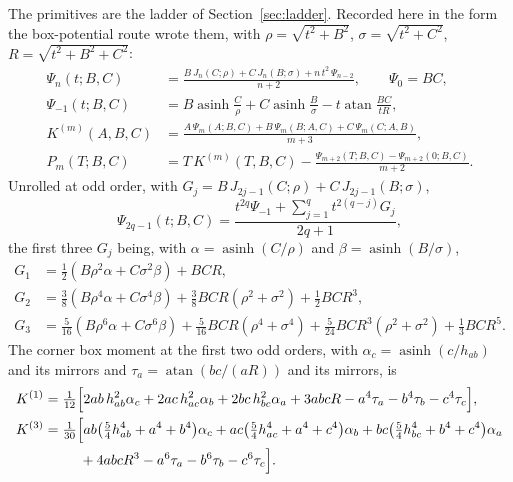 \documentclass[11pt]{article}
\theoremstyle{remark}
\newcommand{\asinh}{\operatorname{asinh}}
\newcommand{\atan}{\operatorname{atan}}
\begin{document}
The primitives are the ladder of Section~\ref{sec:ladder}. Recorded here in the form the
box-potential route wrote them, with $\rho = \sqrt{t^2+B^2}$, $\sigma = \sqrt{t^2+C^2}$,
$R = \sqrt{t^2+B^2+C^2}$:
\begin{equation}
\boxed{\;
\begin{aligned}
\Psi_n(t;B,C) &= \frac{B\,J_n(C;\rho) + C\,J_n(B;\sigma) + n\,t^2\,\Psi_{n-2}}{n+2},\qquad \Psi_0 = BC,\\
\Psi_{-1}(t;B,C) &= B\asinh\frac{C}{\rho} + C\asinh\frac{B}{\sigma} - t\atan\frac{BC}{tR},\\
K^{(m)}(A,B,C) &= \frac{A\,\Psi_m(A;B,C) + B\,\Psi_m(B;A,C) + C\,\Psi_m(C;A,B)}{m+3},\\
P_m(T;B,C) &= T\,K^{(m)}(T,B,C) - \frac{\Psi_{m+2}(T;B,C) - \Psi_{m+2}(0;B,C)}{m+2}.
\end{aligned}\;}
\label{eq:prpprim}
\end{equation}
Unrolled at odd order, with $G_j = B\,J_{2j-1}(C;\rho) + C\,J_{2j-1}(B;\sigma)$,
\begin{equation}
\Psi_{2q-1}(t;B,C) = \frac{t^{2q}\Psi_{-1} + \sum_{j=1}^{q} t^{2(q-j)}G_j}{2q+1},
\end{equation}
the first three $G_j$ being, with $\alpha = \asinh(C/\rho)$ and $\beta = \asinh(B/\sigma)$,
\begin{equation}
\begin{aligned}
G_1 &= \tfrac12(B\rho^2\alpha + C\sigma^2\beta) + BCR,\\
G_2 &= \tfrac38(B\rho^4\alpha + C\sigma^4\beta) + \tfrac38 BCR(\rho^2+\sigma^2) + \tfrac12 BCR^3,\\
G_3 &= \tfrac{5}{16}(B\rho^6\alpha + C\sigma^6\beta) + \tfrac{5}{16}BCR(\rho^4+\sigma^4) + \tfrac{5}{24}BCR^3(\rho^2+\sigma^2) + \tfrac13 BCR^5 .
\end{aligned}
\end{equation}
The corner box moment at the first two odd orders, with $\alpha_c = \asinh(c/h_{ab})$ and
its mirrors and $\tau_a = \atan(bc/(aR))$ and its mirrors, is
\begin{align}
K^{(1)} &= \tfrac{1}{12}\Bigl[2ab\,h_{ab}^2\alpha_c + 2ac\,h_{ac}^2\alpha_b + 2bc\,h_{bc}^2\alpha_a
 + 3abcR - a^4\tau_a - b^4\tau_b - c^4\tau_c\Bigr],\\
K^{(3)} &= \tfrac{1}{30}\Bigl[ab\bigl(\tfrac54 h_{ab}^4 + a^4 + b^4\bigr)\alpha_c
 + ac\bigl(\tfrac54 h_{ac}^4 + a^4 + c^4\bigr)\alpha_b
 + bc\bigl(\tfrac54 h_{bc}^4 + b^4 + c^4\bigr)\alpha_a\notag\\
&\hphantom{= \tfrac{1}{30}\Bigl[} + 4abcR^3 - a^6\tau_a - b^6\tau_b - c^6\tau_c\Bigr].
\end{align}
\end{document}
